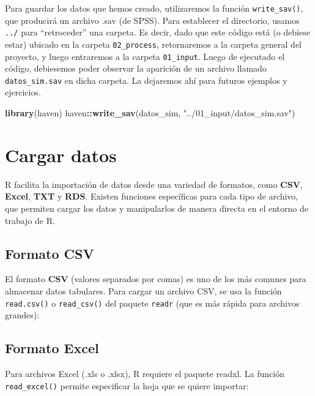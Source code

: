 \documentclass[
]{book}
\newenvironment{Shaded}{\begin{snugshade}}{\end{snugshade}}
\newcommand{\FunctionTok}[1]{\textcolor[rgb]{0.13,0.29,0.53}{\textbf{#1}}}
\newcommand{\NormalTok}[1]{#1}
\newcommand{\SpecialCharTok}[1]{\textcolor[rgb]{0.81,0.36,0.00}{\textbf{#1}}}
\newcommand{\StringTok}[1]{\textcolor[rgb]{0.31,0.60,0.02}{#1}}
\begin{document}
Para guardar los datos que hemos creado, utilizaremos la función \texttt{write\_sav()}, que producirá un archivo .sav (de SPSS). Para establecer el directorio, usamos \texttt{../} para ``retroceder'' una carpeta. Es decir, dado que este código está (o debiese estar) ubicado en la carpeta \texttt{02\_process}, retornaremos a la carpeta general del proyecto, y luego entraremos a la carpeta \texttt{01\_input}. Luego de ejecutado el código, debiesemos poder observar la aparición de un archivo llamado \texttt{datos\_sim.sav} en dicha carpeta. La dejaremos ahí para futuros ejemplos y ejercicios.

\begin{Shaded}
\begin{Highlighting}[]
\FunctionTok{library}\NormalTok{(haven)}
\NormalTok{haven}\SpecialCharTok{::}\FunctionTok{write\_sav}\NormalTok{(datos\_sim, }\StringTok{"../01\_input/datos\_sim.sav"}\NormalTok{)}
\end{Highlighting}
\end{Shaded}

\hypertarget{carga-datos}{%
\chapter{Cargar datos}\label{carga-datos}}

R facilita la importación de datos desde una variedad de formatos, como \textbf{CSV}, \textbf{Excel}, \textbf{TXT} y \textbf{RDS}. Existen funciones específicas para cada tipo de archivo, que permiten cargar los datos y manipularlos de manera directa en el entorno de trabajo de R.

\hypertarget{formato-csv}{%
\section{Formato CSV}\label{formato-csv}}

El formato \textbf{CSV} (valores separados por comas) es uno de los más comunes para almacenar datos tabulares. Para cargar un archivo CSV, se usa la función \texttt{read.csv()} o \texttt{read\_csv()} del paquete \texttt{readr} (que es más rápida para archivos grandes):

\hypertarget{formato-excel}{%
\section{Formato Excel}\label{formato-excel}}

Para archivos Excel (.xls o .xlsx), R requiere el paquete readxl. La función \texttt{read\_excel()} permite especificar la hoja que se quiere importar:
\end{document}
